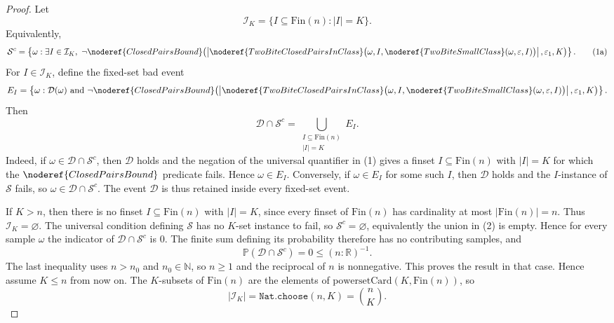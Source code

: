 \begin{proof}
Let
\[
\mathcal I_K=\{I\subseteq\mathrm{Fin}(n): |I|=K\}.
\]
Equivalently,
\[
\mathcal S^c
=\left\{\omega:\exists I\in\mathcal I_K,\ 
\neg\noderef{ClosedPairsBound}\!\left(
\left|\noderef{TwoBiteClosedPairsInClass}
  \bigl(\omega,I,\noderef{TwoBiteSmallClass}(\omega,\varepsilon,I)\bigr)
\right|,
\varepsilon_1,K\right)\right\}. \tag{1a}
\]
For \(I\in\mathcal I_K\), define the fixed-set bad event
\[
E_I=\left\{\omega:\mathcal D(\omega)\ \text{and }
\neg\noderef{ClosedPairsBound}\!\left(
\left|\noderef{TwoBiteClosedPairsInClass}
  \bigl(\omega,I,\noderef{TwoBiteSmallClass}(\omega,\varepsilon,I)\bigr)
\right|,
\varepsilon_1,K\right)\right\}.
\]
Then
\[
\mathcal D\cap\mathcal S^c
=\bigcup_{\substack{I\subseteq\mathrm{Fin}(n)\\ |I|=K}} E_I. \tag{2}
\]
Indeed, if \(\omega\in\mathcal D\cap\mathcal S^c\), then \(\mathcal D\) holds
and the negation of the universal quantifier in (1) gives a finset
\(I\subseteq\mathrm{Fin}(n)\) with \(|I|=K\) for which the
\(\noderef{ClosedPairsBound}\) predicate fails.  Hence
\(\omega\in E_I\).  Conversely, if \(\omega\in E_I\) for some such \(I\), then
\(\mathcal D\) holds and the \(I\)-instance of \(\mathcal S\) fails, so
\(\omega\in\mathcal D\cap\mathcal S^c\).  The event \(\mathcal D\) is thus
retained inside every fixed-set event.

If \(K>n\), then there is no finset \(I\subseteq\mathrm{Fin}(n)\) with
\(|I|=K\), since every finset of \(\mathrm{Fin}(n)\) has cardinality at most
\(|\mathrm{Fin}(n)|=n\).  Thus \(\mathcal I_K=\varnothing\).  The universal
condition defining \(\mathcal S\) has no \(K\)-set instance to fail, so
\(\mathcal S^c=\varnothing\), equivalently the union in (2) is empty.  Hence
for every sample \(\omega\) the indicator of
\(\mathcal D\cap\mathcal S^c\) is \(0\).  The finite sum defining its
probability therefore has no contributing samples, and
\[
\mathbb P(\mathcal D\cap\mathcal S^c)=0\le(n:\mathbb R)^{-1}.
\]
The last inequality uses \(n>n_0\) and \(n_0\in\mathbb N\), so \(n\ge1\) and
the reciprocal of \(n\) is nonnegative.
This proves the result in that case.  Hence assume \(K\le n\) from now on.
The \(K\)-subsets of \(\mathrm{Fin}(n)\) are the elements of
\(\mathrm{powersetCard}(K,\mathrm{Fin}(n))\), so
\[
|\mathcal I_K|=\texttt{Nat.choose}(n,K)=\binom{n}{K}. \tag{3}
\]


\end{proof}
